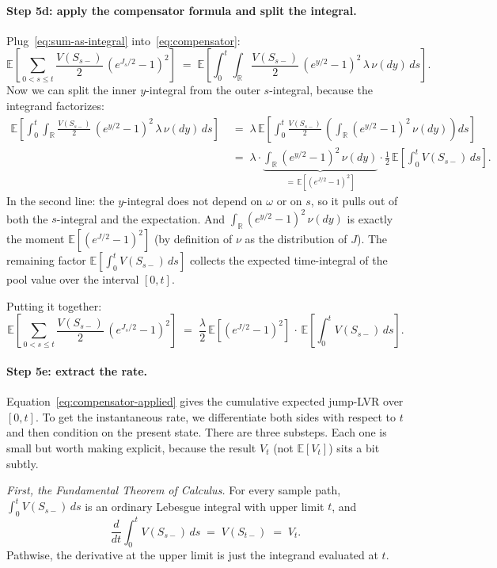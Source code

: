 \documentclass[11pt]{article}
\theoremstyle{definition}
\theoremstyle{remark}
\newcommand{\E}{\mathbb{E}}
\newcommand{\R}{\mathbb{R}}
\newcommand{\1}{\mathbf{1}}
\begin{document}
\paragraph{Step 5d: apply the compensator formula and split the integral.}
Plug~\eqref{eq:sum-as-integral} into~\eqref{eq:compensator}:
\[
\E\!\left[\sum_{0 < s \le t} \frac{V(S_{s-})}{2}\,(e^{J_s/2} - 1)^2\right] \;=\; \E\!\left[\int_0^t\!\int_\R \frac{V(S_{s-})}{2}\,(e^{y/2} - 1)^2\,\lambda\,\nu(dy)\,ds\right].
\]
Now we can split the inner $y$-integral from the outer $s$-integral, because the integrand factorizes:
\begin{align*}
\E\!\left[\int_0^t\!\int_\R \frac{V(S_{s-})}{2}\,(e^{y/2} - 1)^2\,\lambda\,\nu(dy)\,ds\right]
&\;=\; \lambda\,\E\!\left[\int_0^t \frac{V(S_{s-})}{2}\,\left(\int_\R (e^{y/2} - 1)^2\,\nu(dy)\right)\!ds\right] \\
&\;=\; \lambda \cdot \underbrace{\int_\R (e^{y/2} - 1)^2\,\nu(dy)}_{=\,\E[(e^{J/2} - 1)^2]} \cdot \tfrac{1}{2}\,\E\!\left[\int_0^t V(S_{s-})\,ds\right].
\end{align*}
In the second line: the $y$-integral does not depend on $\omega$ or on $s$, so it pulls out of both the $s$-integral and the expectation. And $\int_\R (e^{y/2} - 1)^2\,\nu(dy)$ is exactly the moment $\E[(e^{J/2} - 1)^2]$ (by definition of $\nu$ as the distribution of $J$). The remaining factor $\E[\int_0^t V(S_{s-})\,ds]$ collects the expected time-integral of the pool value over the interval $[0, t]$.

Putting it together:
\begin{equation}\label{eq:compensator-applied}
\E\!\left[\sum_{0 < s \le t} \frac{V(S_{s-})}{2}\,(e^{J_s/2} - 1)^2\right] \;=\; \frac{\lambda}{2}\,\E[(e^{J/2} - 1)^2]\,\cdot\,\E\!\left[\int_0^t V(S_{s-})\,ds\right].
\end{equation}

\paragraph{Step 5e: extract the rate.}
Equation~\eqref{eq:compensator-applied} gives the cumulative expected jump-LVR over $[0, t]$. To get the instantaneous rate, we differentiate both sides with respect to $t$ and then condition on the present state. There are three substeps. Each one is small but worth making explicit, because the result $V_t$ (not $\E[V_t]$) sits a bit subtly.

\emph{First, the Fundamental Theorem of Calculus.} For every sample path, $\int_0^t V(S_{s-})\,ds$ is an ordinary Lebesgue integral with upper limit $t$, and
\[
\frac{d}{dt}\int_0^t V(S_{s-})\,ds \;=\; V(S_{t-}) \;=\; V_t.
\]
Pathwise, the derivative at the upper limit is just the integrand evaluated at $t$.
\end{document}
